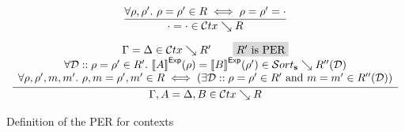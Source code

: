 \begin{figure}
  \[
  \begin{array}{c}
    \infer{
      \ctxempty = \ctxempty \in \perctx \searrow R
    }{
      \forall \rho, \rho'.\ \rho = \rho' \in R \iff \rho = \rho' = \denvempty
    }
    \\[8pt]
    \infer{
      \ctxext \Gamma A = \ctxext \Delta B \in \perctx \searrow R
    }{
      \begin{array}{c}
        \Gamma = \Delta \in \perctx \searrow R'
        \qquad
        \mhighlight{R' \text{ is PER}}
        \\
        \forall \DD :: \rho = \rho' \in R'.\ \evalexpfunc A \rho = \evalexpfunc {B} {\rho'} \in \persort \searrow R''(\DD)
        \\
        \forall \rho, \rho', m, m'.\ \denvext \rho m = \denvext {\rho'} {m'} \in R \iff (\exists \DD :: \rho = \rho' \in R' ~ \text{and} ~ m = m' \in R''(\DD))
      \end{array}
    }
  \end{array}
  \]
  \caption{Definition of the \ac{PER} for contexts}
  \label{fig:per-ctx}
\end{figure}
